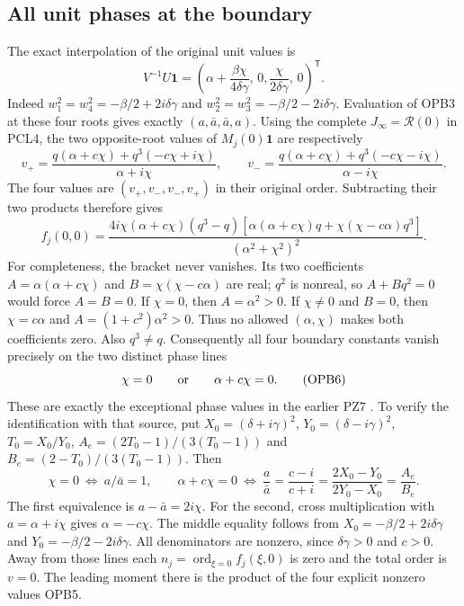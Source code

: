 \subsection{All unit phases at the boundary}
The exact interpolation of the original unit values is
\[
 V^{-1}U\boldsymbol1=
 \left(\alpha+\frac{\beta\chi}{4\delta\gamma},\,0,
              \frac{\chi}{2\delta\gamma},\,0\right)^{\mathsf T}.
 \tag{OPB3}
\]
Indeed $w_1^2=w_4^2=-\beta/2+2i\delta\gamma$ and
$w_2^2=w_3^2=-\beta/2-2i\delta\gamma$. Evaluation of OPB3 at
these four roots gives exactly $(a,\bar a,\bar a,a)$.
Using the complete $J_\infty=\mathcal R(0)$ in PCL4, the two
opposite-root values of $M_j(0)\boldsymbol1$ are respectively
\[
 v_+=\frac{q(\alpha+c\chi)+q^3(-c\chi+i\chi)}{\alpha+i\chi},
 \qquad
 v_-=\frac{q(\alpha+c\chi)+q^3(-c\chi-i\chi)}{\alpha-i\chi}.
 \tag{OPB4}
\]
The four values are $(v_+,v_-,v_-,v_+)$ in their original order.
Subtracting their two products therefore gives
\[
 f_j(0,0)=
 \frac{4i\chi(\alpha+c\chi)(q^3-q)
 [\alpha(\alpha+c\chi)q+\chi(\chi-c\alpha)q^3]}
 {(\alpha^2+\chi^2)^2}.
 \tag{OPB5}
\]
For completeness, the bracket never vanishes. Its two coefficients
$A=\alpha(\alpha+c\chi)$ and $B=\chi(\chi-c\alpha)$ are real;
$q^2$ is nonreal, so $A+Bq^2=0$ would force $A=B=0$.
If $\chi=0$, then $A=\alpha^2>0$. If $\chi\ne0$ and $B=0$,
then $\chi=c\alpha$ and $A=(1+c^2)\alpha^2>0$.
Thus no allowed $(\alpha,\chi)$ makes both coefficients zero.
Also $q^3\ne q$. Consequently all four boundary constants vanish
precisely on the two distinct phase lines
\[
             \chi=0\qquad\hbox{or}\qquad\alpha+c\chi=0.
 \tag{OPB6}
\]
These are exactly the exceptional phase values in the earlier PZ7
\cite{PeriodZeroOriginal}. To verify the identification with that source,
put $X_0=(\delta+i\gamma)^2$, $Y_0=(\delta-i\gamma)^2$,
$T_0=X_0/Y_0$, $A_e=(2T_0-1)/(3(T_0-1))$ and
$B_e=(2-T_0)/(3(T_0-1))$. Then
\[
 \chi=0\ \Longleftrightarrow\ a/\bar a=1,\qquad
 \alpha+c\chi=0\ \Longleftrightarrow\
 \frac a{\bar a}=\frac{c-i}{c+i}
       =\frac{2X_0-Y_0}{2Y_0-X_0}=\frac{A_e}{B_e}.
 \tag{OPB6a}
\]
The first equivalence is $a-\bar a=2i\chi$.
For the second, cross multiplication with $a=\alpha+i\chi$ gives
$\alpha=-c\chi$. The middle equality follows from
$X_0=-\beta/2+2i\delta\gamma$ and
$Y_0=-\beta/2-2i\delta\gamma$. All denominators are nonzero,
since $\delta\gamma>0$ and $c>0$.
Away from those lines each $n_j=\operatorname{ord}_{\xi=0}f_j(\xi,0)$
is zero and the total order is $v=0$. The leading moment there is
the product of the four explicit nonzero values OPB5.


